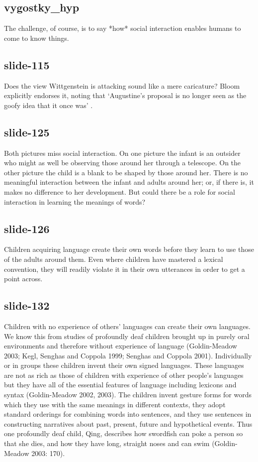 \documentclass[12pt,\papersize]{extarticle}
\begin{document}
 
\subsection{vygostky\_hyp}
The challenge, of course, is to say *how* social interaction enables humans to come to know things.
 
 
\subsection{slide-115}
Does the view Wittgenstein is attacking sound like a mere caricature? Bloom explicitly endorses it, noting that ‘Augustine’s proposal is no longer seen as the goofy idea that it once was’ \citep[p.\ 61]{Bloom:2000qz}.
 
 
\subsection{slide-125}
Both pictures miss social interaction.
On one picture the infant is an outsider who might as well be observing those around her through a telescope.
On the other picture the child is a blank to be shaped by those around her.
There is no meaningful interaction between the infant and adults around her; or, if there is, it makes no difference to her development.
But could there be a role for social interaction in learning the meanings of words?
 
 
\subsection{slide-126}
Children acquiring language create their own words before they learn to use those of the adults around them.
Even where children have mastered a lexical convention, they will readily violate it in their own utterances in order to get a point across.
 
 
\subsection{slide-132}
Children with no experience of others' languages can create their own languages.
We know this from studies of profoundly deaf children brought up in purely oral environments and therefore without experience of language (Goldin-Meadow 2003; Kegl, Senghas and Coppola 1999; Senghas and Coppola 2001).
Individually or in groups these children invent their own signed languages.
These languages are not as rich as those of children with experience of other people's languages but they have all of the essential features of language including lexicons and syntax (Goldin-Meadow 2002, 2003).
The children invent gesture forms for words which they use with the same meanings in different contexts, they adopt standard orderings for combining words into sentences, and they use sentences in constructing narratives about past, present, future and hypothetical events. Thus one profoundly deaf child, Qing, describes how swordfish can poke a person so that she dies, and how they have long, straight noses and can swim (Goldin-Meadow 2003: 170).
 
\end{document}
